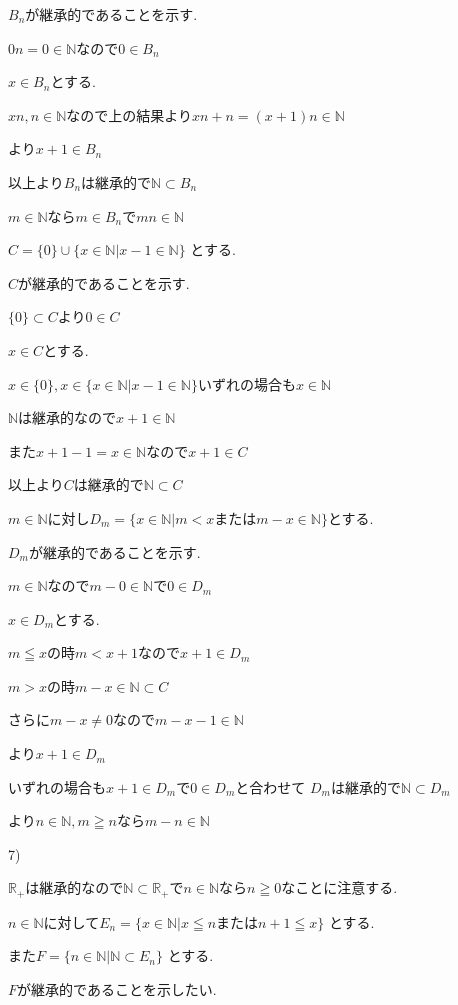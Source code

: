 \documentclass{jsarticle}
\begin{document}
$B_n$が継承的であることを示す.

$0n = 0\in \mathbb{N}$なので$0\in B_n$

$x\in B_n$とする.

$xn,n\in \mathbb{N}$なので上の結果より$xn+n=(x+1)n\in \mathbb{N}$

より$x+1\in B_n$

以上より$B_n$は継承的で$\mathbb{N} \subset B_n$

$m\in \mathbb{N}$なら$m\in B_n$で$mn\in\mathbb{N}$

$C=\{0\}\cup \{x\in \mathbb{N}|x-1\in\mathbb{N}\}$
とする.

$C$が継承的であることを示す.

$\{0\}\subset C$より$0\in C$

$x\in C$とする.

$x\in\{0\},x\in \{x\in \mathbb{N}|x-1\in\mathbb{N}\}$いずれの場合も$x\in\mathbb{N}$

$\mathbb{N}$は継承的なので$x+1\in\mathbb{N}$

また$x+1-1=x\in \mathbb{N}$なので$x+1\in C$

以上より$C$は継承的で$\mathbb{N} \subset C$

$m\in \mathbb{N}$に対し$D_m=\{x\in \mathbb{N}|m< x または m-x\in\mathbb{N}\}$とする.

$D_m$が継承的であることを示す.

$m\in \mathbb{N}$なので$m-0\in \mathbb{N}$で$0\in D_m$

$x\in D_m$とする.

$m\leqq x$の時$m<x+1$なので$x+1\in D_m$

$m>x$の時$m-x\in \mathbb{N}\subset C$

さらに$m-x\neq 0$なので$m-x-1\in\mathbb{N}$

より$x+1\in D_m$

いずれの場合も$x+1\in D_m$で$0\in D_m$と合わせて
$D_m$は継承的で$\mathbb{N} \subset D_m$

より$n\in \mathbb{N},m\geqq n$なら$m-n\in\mathbb{N}$

7)

$\mathbb{R}_+$は継承的なので$\mathbb{N}\subset \mathbb{R}_+$で$n\in \mathbb{N}$なら$n\geqq 0$なことに注意する.

$n\in \mathbb{N}$に対して$E_n=\{x\in \mathbb{N}|x\leqq nまたは n+1\leqq x\}$
とする.

また$F=\{n\in \mathbb{N}|\mathbb{N}\subset E_n\}$
とする.

$F$が継承的であることを示したい.
\end{document}

